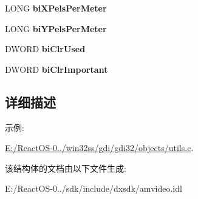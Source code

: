 \begin{DoxyCompactItemize}
L\+O\+NG {\bfseries bi\+X\+Pels\+Per\+Meter}
\item 
\mbox{\label{struct_b_i_t_m_a_p_i_n_f_o_h_e_a_d_e_r_a2364a8e9b8471459be76df7a73d8d314}} 
L\+O\+NG {\bfseries bi\+Y\+Pels\+Per\+Meter}
\item 
\mbox{\label{struct_b_i_t_m_a_p_i_n_f_o_h_e_a_d_e_r_a070ff95afaf7b25e2ec779536a8d1800}} 
D\+W\+O\+RD {\bfseries bi\+Clr\+Used}
\item 
\mbox{\label{struct_b_i_t_m_a_p_i_n_f_o_h_e_a_d_e_r_a71feaaa15749a0284945e802b237a73d}} 
D\+W\+O\+RD {\bfseries bi\+Clr\+Important}
\end{DoxyCompactItemize}


\subsection{详细描述}
\begin{Desc}
\item[示例\+: ]\par
\hyperlink{_e_1_2_react_o_s-0_84_86_2win32ss_2gdi_2gdi32_2objects_2utils_8c-example}{E\+:/\+React\+O\+S-\/0../win32ss/gdi/gdi32/objects/utils.\+c}.\end{Desc}


该结构体的文档由以下文件生成\+:\begin{DoxyCompactItemize}
\item 
E\+:/\+React\+O\+S-\/0../sdk/include/dxsdk/amvideo.\+idl\end{DoxyCompactItemize}
